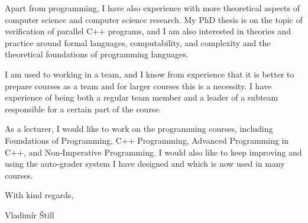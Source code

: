 \documentclass[11pt,a4paper]{article}
\begin{document}
Apart from programming, I have also experience with more theoretical aspects of computer science and computer science research.
My PhD thesis is on the topic of verification of parallel C++ programs, and I am also interested in theories and practice around formal languages, computability, and complexity and the theoretical foundations of programming languages.

I am used to working in a team, and I know from experience that it is better to prepare courses as a team and for larger courses this is a necessity.
I have experience of being both a regular team member and a leader of a subteam responsible for a certain part of the course.

As a lecturer, I would like to work on the programming courses, including Foundations of Programming, C++ Programming, Advanced Programming in C++, and Non-Imperative Programming.
I would also like to keep improving and using the auto-grader system I have designed and which is now used in many courses.

\smallskip
With kind regards,\par
Vladimír Štill
\end{document}
